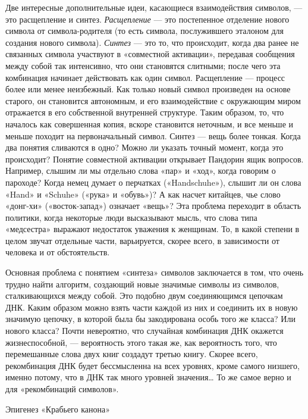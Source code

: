 \documentclass[../main.tex]{subfiles}
\begin{document}
Две интересные дополнительные идеи, касающиеся взаимодействия символов, --- это расщепление и синтез. \emph{Расщепление} --- это постепенное отделение нового символа от символа-родителя (то есть символа, послужившего эталоном для создания нового символа). \emph{Синтез} --- это то, что происходит, когда два ранее не связанных символа участвуют в «совместной активации», передавая сообщения между собой так интенсивно, что они становятся слитными; после чего эта комбинация начинает действовать как один символ. Расщепление --- процесс более или менее неизбежный. Как только новый символ произведен на основе старого, он становится автономным, и его взаимодействие с окружающим миром отражается в его собственной внутренней структуре. Таким образом, то, что началось как совершенная копия, вскоре становится неточным, и все меньше и меньше походит на первоначальный символ. Синтез --- вещь более тонкая. Когда два понятия сливаются в одно? Можно ли указать точный момент, когда это происходит? Понятие совместной активации открывает Пандорин ящик вопросов. Например, слышим ли мы отдельно слова «пар» и «ход», когда говорим о пароходе? Когда немец думает о перчатках («Handschuhe»), слышит ли он слова «Hand» и «Schuhe» («рука» и «обувь»)? А как насчет китайцев, чье слово «донг-хи» («восток-запад») означает «вещь»? Эта проблема переходит в область политики, когда некоторые люди высказывают мысль, что слова типа «медсестра» выражают недостаток уважения к женщинам. То, в какой степени в целом звучат отдельные части, варьируется, скорее всего, в зависимости от человека и от обстоятельств.

Основная проблема с понятием «синтеза» символов заключается в том, что очень трудно найти алгоритм, создающий новые значимые символы из символов, сталкивающихся между собой. Это подобно двум соединяющимся цепочкам ДНК\@. Каким образом можно взять части каждой из них и соединить их в новую значимую цепочку, в которой была бы закодирована особь того же класса? Или нового класса? Почти невероятно, что случайная комбинация ДНК окажется жизнеспособной, --- вероятность этого такая же, как вероятность того, что перемешанные слова двух книг создадут третью книгу. Скорее всего, рекомбинация ДНК будет бессмысленна на всех уровнях, кроме самого низшего, именно потому, что в ДНК так много уровней значения\ldots{} То же самое верно и для «рекомбинаций символов».

Эпигенез «Крабьего канона»
\end{document}
